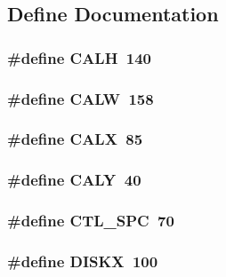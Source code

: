 \subsection{Define Documentation}
\hypertarget{WL__MENU_8C_af0a873674736559b8c3ffd9b2a5f03a6}{
\subsubsection[{CALH}]{\setlength{\rightskip}{0pt plus 5cm}\#define CALH~140}}
\label{WL__MENU_8C_af0a873674736559b8c3ffd9b2a5f03a6}
\hypertarget{WL__MENU_8C_a4ae60b3db9a147f11f115f1d3191b5f2}{
\subsubsection[{CALW}]{\setlength{\rightskip}{0pt plus 5cm}\#define CALW~158}}
\label{WL__MENU_8C_a4ae60b3db9a147f11f115f1d3191b5f2}
\hypertarget{WL__MENU_8C_aac3806357bc5624168e71360e86e85dd}{
\subsubsection[{CALX}]{\setlength{\rightskip}{0pt plus 5cm}\#define CALX~85}}
\label{WL__MENU_8C_aac3806357bc5624168e71360e86e85dd}
\hypertarget{WL__MENU_8C_a8660b9c69109a6b308e1cf644b7cd4e2}{
\subsubsection[{CALY}]{\setlength{\rightskip}{0pt plus 5cm}\#define CALY~40}}
\label{WL__MENU_8C_a8660b9c69109a6b308e1cf644b7cd4e2}
\hypertarget{WL__MENU_8C_a3f0b9b62d1ec031b0da57a392e765c39}{
\subsubsection[{CTL\_\-SPC}]{\setlength{\rightskip}{0pt plus 5cm}\#define CTL\_\-SPC~70}}
\label{WL__MENU_8C_a3f0b9b62d1ec031b0da57a392e765c39}
\hypertarget{WL__MENU_8C_adc41a8014e75e6a58fd7a80baf966ea9}{
\subsubsection[{DISKX}]{\setlength{\rightskip}{0pt plus 5cm}\#define DISKX~100}}
